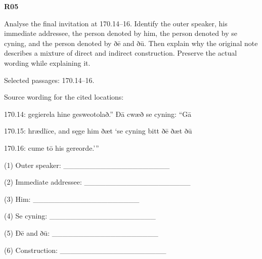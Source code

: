 \par\begin{minipage}{\linewidth}\raggedright
\textbf{R05}

Analyse the final invitation at 170.14–16. Identify the outer speaker, his immediate addressee, the person denoted by him, the person denoted by se cyning, and the person denoted by ðē and ðū. Then explain why the original note describes a mixture of direct and indirect construction. Preserve the actual wording while explaining it.

Selected passages: 170.14–16.

Source wording for the cited locations:

170.14: gegierela hine gesweotolað.” Ðā cwæð se cyning: “Gā

170.15: hrædlīce, and sęge him ðæt ‘se cyning bitt ðē ðæt ðū

170.16: cume tō his gereorde.’”

(1) Outer speaker: \_\_\_\_\_\_\_\_\_\_\_\_\_\_\_\_\_\_\_\_

(2) Immediate addressee: \_\_\_\_\_\_\_\_\_\_\_\_\_\_\_\_\_\_\_\_

(3) Him: \_\_\_\_\_\_\_\_\_\_\_\_\_\_\_\_\_\_\_\_

(4) Se cyning: \_\_\_\_\_\_\_\_\_\_\_\_\_\_\_\_\_\_\_\_

(5) Ðē and ðū: \_\_\_\_\_\_\_\_\_\_\_\_\_\_\_\_\_\_\_\_

(6) Construction: \_\_\_\_\_\_\_\_\_\_\_\_\_\_\_\_\_\_\_\_

\end{minipage}\par\addvspace{4pt}

